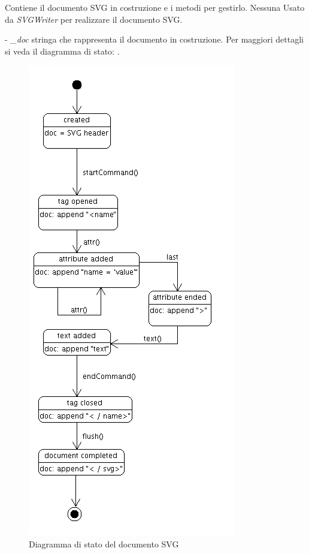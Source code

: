 Contiene il documento SVG in costruzione e i metodi per gestirlo.
Nessuna
Usato da \textit{SVGWriter} per realizzare il documento SVG.
\begin{elencopuntato}[\subsubsecindent]
\item[-] \textit{{\_}doc} stringa che rappresenta il documento in costruzione.
Per maggiori dettagli si veda il diagramma di stato: .
\begin{figure}[!ht]
\centering
\includegraphics[scale=0.7]{svgdocument.png}
\caption{Diagramma di stato del documento SVG}
\end{figure}

\end{elencopuntato}
